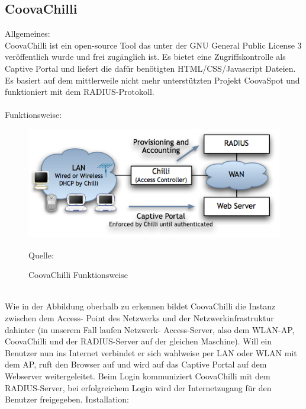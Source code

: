 \subsection{CoovaChilli}
Allgemeines:\\
CoovaChilli ist ein open-source Tool das unter der GNU General Public License 3 veröffentlich wurde und frei zugänglich ist. Es bietet eine Zugriffskontrolle als Captive Portal und liefert die dafür benötigten HTML/CSS/Javascript Dateien. Es basiert auf dem mittlerweile nicht mehr unterstützten Projekt CoovaSpot und funktioniert mit dem RADIUS-Protokoll.\\
~\\
Funktionsweise:
\begin{figure}[ht]                                                                              
\includegraphics[width=\textwidth]{pictures/Tom/Chilli}
\caption{CoovaChilli Funktionsweise}
Quelle: \cite{chilli2}
\end{figure}
~\\
Wie in der Abbildung oberhalb zu erkennen bildet CoovaChilli die Instanz zwischen dem Access-
Point des Netzwerks und der Netzwerkinfrastruktur dahinter (in unserem Fall laufen Netzwerk-
Access-Server, also dem WLAN-AP, CoovaChilli und der RADIUS-Server auf der gleichen Maschine).
Will ein Benutzer nun ins Internet verbindet er sich wahlweise per LAN oder WLAN mit dem AP,
ruft den Browser auf und wird auf das Captive Portal auf dem Webserver weitergeleitet. Beim
Login kommuniziert CoovaChilli mit dem RADIUS-Server, bei erfolgreichem Login wird der
Internetzugang für den Benutzer freigegeben.
\newpage
Installation:\\

